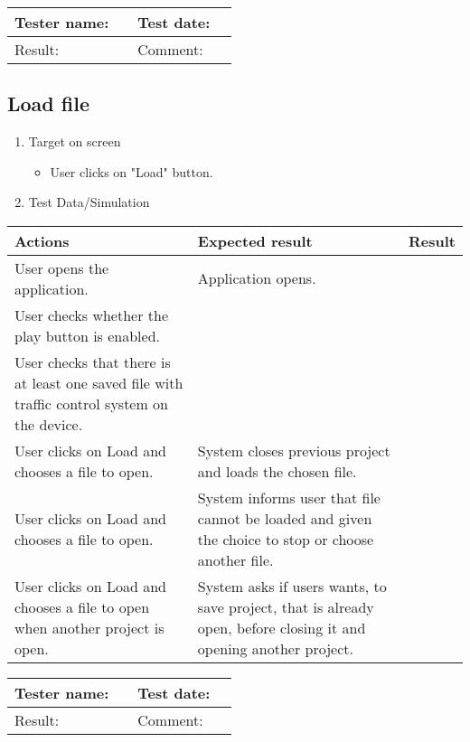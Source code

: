 \begin{tabularx}{\textwidth}{|p{3cm}X|p{3cm}X|}\hline
	Tester name: &  & Test date: & \\\hline
	Result: &  \pass & Comment: & \\\hline
\end{tabularx}



\subsection{Load file}

\begin{enumerate}
	
	\item Target on screen
	\begin{itemize}
		\item User clicks on "Load" button.
	\end{itemize}
	\item Test Data/Simulation
\end{enumerate}
	\begin{tabularx}{\textwidth}{|X|X|p{2.5cm}|}\hline
		Actions & Expected result & Result \\\hline
		User opens the application.& Application opens. &  \pass \\\hline
		User checks whether the play button is enabled. & &  \pass \\\hline
		User checks that there is at least one saved file with traffic control system on the device.& &\pass \\\hline
		User clicks on Load and chooses a file to open. & System closes previous project and loads the chosen file.  & \pass \\\hline 
		User clicks on Load and chooses a file to open. & System informs user that file cannot be loaded and given the choice
		to stop or choose another file. & \pass \\\hline 
		User clicks on Load and chooses a file to open when another project is open. & System asks if users wants, to save project, that is already open, before closing it and opening another project. & \pass \\\hline 
	\end{tabularx}

\begin{tabularx}{\textwidth}{|p{3cm}X|p{3cm}X|}\hline
	Tester name: &  & Test date: & \\\hline
	Result: &  \pass & Comment: & \\\hline
\end{tabularx}

